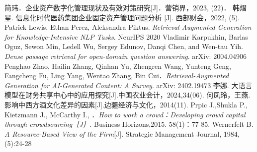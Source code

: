 \documentclass[zihao=-4]{ctexart}
\begin{document}
\begin{thebibliography}{99}
    简玮．企业资产数字化管理现状及有效对策研究[J]．营销界，2023, (22)． 
    韩熠星. 信息化时代医药集团企业固定资产管理问题分析 [J]. 西部财会，2022, (5).
    Patrick Lewis, Ethan Perez, Aleksandra Piktus. \textit{Retrieval-Augmented Generation for Knowledge-Intensive NLP Tasks}. NeurIPS 2020
    Vladimir Karpukhin, Barlas Oguz, Sewon Min, Ledell Wu, Sergey Edunov, Danqi Chen, and Wen-tau Yih. \textit{Dense passage retrieval for open-domain question answering}. arXiv: 2004.04906
    Penghao Zhao, Hailin Zhang, Qinhan Yu, Zhengren Wang, Yunteng Geng, Fangcheng Fu, Ling Yang, Wentao Zhang, Bin Cui．\textit{Retrieval-Augmented Generation for AI-Generated Content: A Survey}. arXiv: 2402.19473 
    李娜. 大语言模型在财务共享中心中的应用探究[J].中国农业会计，2024,34(06).
    何凤玲，王燕.影响中西方酒文化差异的因素[J].边疆经济与文化，2014(11).
    Prpic J.,Shukla P., Kietzmann J., McCarthy I., ．\textit{How to work a
crowd：Developing crowd capital through crowdsourcing［J］}. Business Horizons,2015. 58(1)：77-85.
  Wernerfelt B. \textit{A Resource-Based View of the Firm}[J]. Strategic Management Journal, 1984, (5):24-28
\end{thebibliography}

\end{document}
